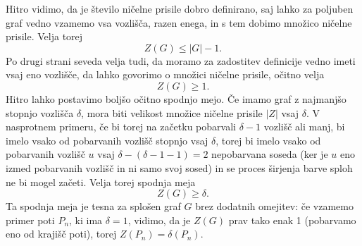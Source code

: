 \documentclass[12pt,a4paper,twoside]{article}
\theoremstyle{definition} %
\theoremstyle{plain} %
\numberwithin{equation}{section}  %
\begin{document}
Hitro vidimo, da je število ničelne prisile dobro definirano, saj lahko za poljuben graf vedno vzamemo vsa vozlišča, razen enega, in s tem dobimo množico ničelne prisile. Velja torej
\begin{equation}
    Z(G) \leq |G| - 1.
    \label{eq:trv-zgornja-meja}
\end{equation}
Po drugi strani seveda velja tudi, da moramo za zadostitev definicije vedno imeti vsaj eno vozlišče, da lahko govorimo o množici ničelne prisile, očitno velja
\begin{equation}
Z(G)  \geq 1.
\label{eq:trv-trv-spodnja-meja}
\end{equation}
Hitro lahko postavimo boljšo očitno spodnjo mejo. Če imamo graf z najmanjšo stopnjo vozlišča $\delta$, mora biti velikost množice ničelne prisile $|Z|$ vsaj $\delta$. V nasprotnem primeru, če bi torej na začetku pobarvali $\delta - 1$ vozlišč ali manj, bi imelo vsako od pobarvanih vozlišč stopnjo vsaj $\delta$, torej bi imelo vsako od pobarvanih vozlišč $u$ vsaj $\delta - (\delta - 1 - 1) = 2$ nepobarvana soseda (ker je $u$ eno izmed pobarvanih vozlišč in ni samo svoj sosed) in se proces širjenja barve sploh ne bi mogel začeti. Velja torej spodnja meja
\begin{equation}
    Z(G) \geq \delta.
    \label{eq:trv-spodnja-meja}
\end{equation}
Ta spodnja meja je tesna za splošen graf $G$ brez dodatnih omejitev: če vzamemo primer poti $P_n$, ki ima $\delta = 1$, vidimo, da je $Z(G)$ prav tako enak 1 (pobarvamo eno od krajišč poti), torej $Z(P_n) = \delta(P_n).$
\end{document}
